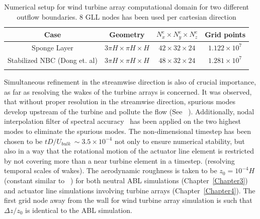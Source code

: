 \begin{table}[ht] 
\centering %
\begin{tabular}{c c c c} %
\hline\hline    %
Case & Geometry & $N^{e}_x\times N^{e}_y\times N^{e}_z$  & Grid points   \\ [0.5 ex] %
\hline  %
Sponge Layer & $3\pi H \times \pi H \times H$ & $42\times 32\times 24$ & $1.122\times 10^7$ \\ %
Stabilized NBC (Dong et. al) & $3\pi H \times \pi H \times H$ & $48\times 32\times 24$ & $1.281\times 10^7$  \\ [1ex] %
\hline\hline \\ [1 ex]
\end{tabular} 
\caption[Wind turbine array: Computational Domain]{Numerical setup for wind turbine array computational domain for two different outflow boundaries. 8 GLL nodes has been used per cartesian direction } %
\label{table:grid2} %
\end{table} 
Simultaneous refinement in the streamwise direction is also of crucial importance, as far as resolving the wakes of the turbine arrays is concerned. It was observed, that without proper resolution in the streamwise direction, spurious modes develop upstream of the turbine and pollute the flow (See ~\cite{tan}). Additionally, nodal interpolation filter of spectral accuracy~\cite{fischer_filter} has been applied on the two highest modes to eliminate the spurious modes. The non-dimensional timestep has been chosen to be $tD/U_{bulk} \ \sim 3.5\times 10^{-4}$ not only to ensure numerical stability, but also in a way that the rotational motion of the actuator line element is restricted by not covering more than a near turbine element in a timestep. (resolving temporal scales of wakes).  The aerodynamic roughness is taken to be $z_0 = 10^{-4}H$ (constant similar to ~\cite{porte2a,porte1fun}) for both neutral ABL simulations (Chapter~\ref{Chapter3}) and actuator line simulations involving turbine arrays (Chapter~\ref{Chapter4}). The first grid node away from the wall for wind turbine array simulation is such that $\Delta z/z_0$ is identical to the ABL simulation.

